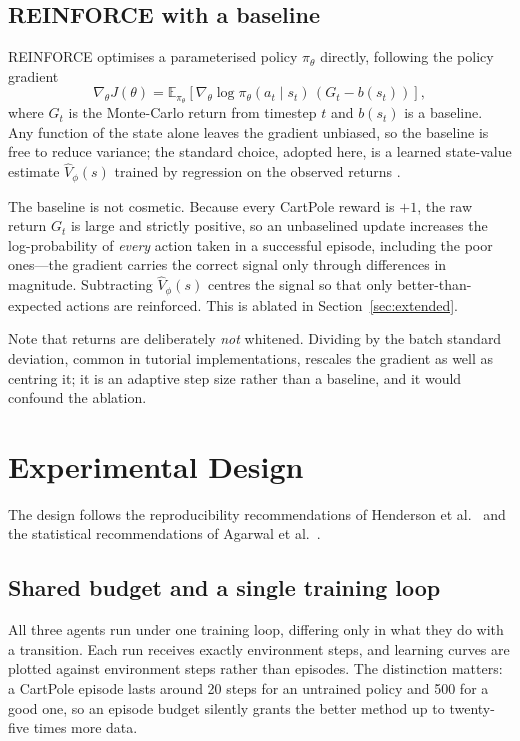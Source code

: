 \documentclass[conference]{IEEEtran}
\begin{document}
\subsection{REINFORCE with a baseline}

REINFORCE \cite{williams1992} optimises a parameterised policy $\pi_\theta$
directly, following the policy gradient
\begin{equation}
\nabla_\theta J(\theta) = \mathbb{E}_{\pi_\theta}
\left[ \nabla_\theta \log \pi_\theta(a_t \mid s_t)\,
\left( G_t - b(s_t) \right) \right],
\end{equation}
where $G_t$ is the Monte-Carlo return from timestep $t$ and $b(s_t)$ is a
baseline. Any function of the state alone leaves the gradient unbiased, so the
baseline is free to reduce variance; the standard choice, adopted here, is a
learned state-value estimate $\hat{V}_\phi(s)$ trained by regression on the
observed returns \cite{sutton2018}.

The baseline is not cosmetic. Because every CartPole reward is $+1$, the raw
return $G_t$ is large and strictly positive, so an unbaselined update increases
the log-probability of \emph{every} action taken in a successful episode,
including the poor ones---the gradient carries the correct signal only through
differences in magnitude. Subtracting $\hat{V}_\phi(s)$ centres the signal so
that only better-than-expected actions are reinforced. This is ablated in
Section~\ref{sec:extended}.

Note that returns are deliberately \emph{not} whitened. Dividing by the batch
standard deviation, common in tutorial implementations, rescales the gradient as
well as centring it; it is an adaptive step size rather than a baseline, and it
would confound the ablation.

\section{Experimental Design}
\label{sec:design}

The design follows the reproducibility recommendations of Henderson et al.\
\cite{henderson2018} and the statistical recommendations of Agarwal et al.\
\cite{agarwal2021}.

\subsection{Shared budget and a single training loop}

All three agents run under one training loop, differing only in what they do with
a transition. Each run receives exactly \StepBudget{} environment steps, and
learning curves are plotted against environment steps rather than episodes. The
distinction matters: a CartPole episode lasts around 20 steps for an untrained
policy and 500 for a good one, so an episode budget silently grants the better
method up to twenty-five times more data.
\end{document}
